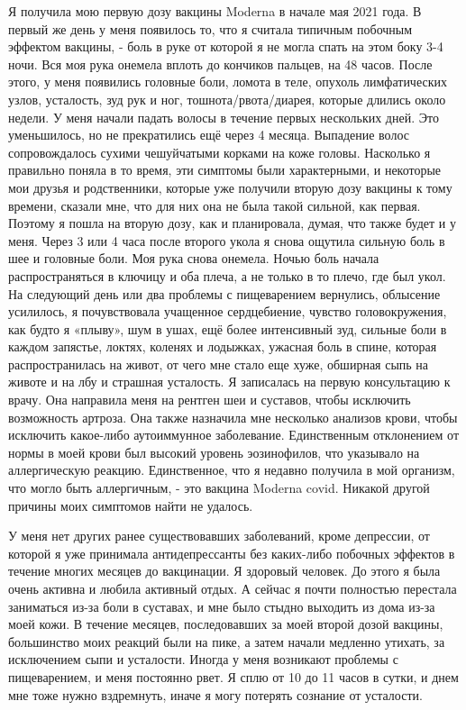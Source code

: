 Я получила мою первую дозу вакцины Moderna в начале мая 2021 года. В первый же
день у меня появилось то, что я считала типичным побочным эффектом вакцины, -
боль в руке от которой я не могла спать на этом боку 3-4 ночи. Вся моя рука
онемела вплоть до кончиков пальцев, на 48 часов. После этого, у меня появились
головные боли, ломота в теле, опухоль лимфатических узлов, усталость, зуд рук и
ног, тошнота/рвота/диарея, которые длились около недели. У меня начали падать
волосы в течение первых нескольких дней. Это уменьшилось, но не прекратились ещё
через 4 месяца. Выпадение волос сопровождалось сухими чешуйчатыми корками на
коже головы. Насколько я правильно поняла в то время, эти симптомы были
характерными, и некоторые мои друзья и родственники, которые уже получили вторую
дозу вакцины к тому времени, сказали мне, что для них она не была такой сильной,
как первая. Поэтому я пошла на вторую дозу, как и планировала, думая, что также
будет и у меня. Через 3 или 4 часа после второго укола я снова ощутила сильную
боль в шее и головные боли. Моя рука снова онемела. Ночью боль начала
распространяться в ключицу и оба плеча, а не только в то плечо, где был укол. На
следующий день или два проблемы с пищеварением вернулись, облысение усилилось, я
почувствовала учащенное сердцебиение, чувство головокружения, как будто я
«плыву», шум в ушах, ещё более интенсивный зуд, сильные боли в каждом запястье,
локтях, коленях и лодыжках, ужасная боль в спине, которая распространилась на
живот, от чего мне стало еще хуже, обширная сыпь на животе и на лбу и страшная
усталость. Я записалась на первую консультацию к врачу. Она направила меня на
рентген шеи и суставов, чтобы исключить возможность артроза. Она также назначила
мне несколько анализов крови, чтобы исключить какое-либо аутоиммунное
заболевание. Единственным отклонением от нормы в моей крови был высокий уровень
эозинофилов, что указывало на аллергическую реакцию. Единственное, что я недавно
получила в мой организм, что могло быть аллергичным, - это вакцина Moderna
covid. Никакой другой причины моих симптомов найти не удалось.

У меня нет других ранее существовавших заболеваний, кроме депрессии, от которой
я уже принимала антидепрессанты без каких-либо побочных эффектов в течение
многих месяцев до вакцинации. Я здоровый человек. До этого я была очень активна
и любила активный отдых. А сейчас я почти полностью перестала заниматься из-за
боли в суставах, и мне было стыдно выходить из дома из-за моей кожи. В течение
месяцев, последовавших за моей второй дозой вакцины, большинство моих реакций
были на пике, а затем начали медленно утихать, за исключением сыпи и
усталости. Иногда у меня возникают проблемы с пищеварением, и меня постоянно
рвет. Я сплю от 10 до 11 часов в сутки, и днем мне тоже нужно вздремнуть, иначе
я могу потерять сознание от усталости.


